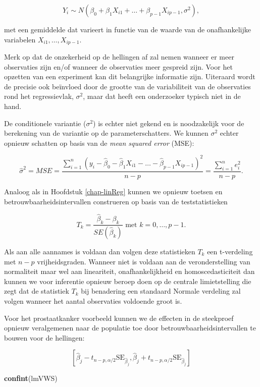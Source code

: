 \documentclass[
  12pt,dutch]{book}
\newenvironment{Shaded}{\begin{snugshade}}{\end{snugshade}}
\newcommand{\FunctionTok}[1]{\textcolor[rgb]{0.13,0.29,0.53}{\textbf{#1}}}
\newcommand{\NormalTok}[1]{#1}
\theoremstyle{definition}
\theoremstyle{definition}
\theoremstyle{definition}
\theoremstyle{definition}
\theoremstyle{remark}
\begin{document}
\[Y_i\sim N(\beta_0+\beta_1 X_{i1}+\ldots+\beta_{p-1} X_{ip-1},\sigma^2),\]

met een gemiddelde dat varieert in functie van de waarde van de onafhankelijke variabelen \(X_{i1},\ldots,X_{ip-1}\).

Merk op dat de onzekerheid op de hellingen af zal nemen wanneer er meer observaties zijn en/of wanneer de observaties meer gespreid zijn. Voor het opzetten van een experiment kan dit belangrijke informatie zijn. Uiteraard wordt de precisie ook beïnvloed door de grootte van de variabiliteit van de observaties rond het regressievlak, \(\sigma^2\), maar dat heeft een onderzoeker typisch niet in de hand.

De conditionele variantie (\(\sigma^2\)) is echter niet gekend en is noodzakelijk voor de berekening van de variantie op de parameterschatters. We kunnen \(\sigma^2\) echter opnieuw schatten op basis van de \emph{mean squared error} (MSE):

\[\hat\sigma^2=MSE=\frac{\sum\limits_{i=1}^n \left(y_i-\hat\beta_0-\hat\beta_1 X_{i1}-\ldots-\hat\beta_{p-1} X_{ip-1}\right)^2}{n-p}=\frac{\sum\limits_{i=1}^n e^2_i}{n-p}.\]

Analoog als in Hoofdstuk \ref{chap-linReg} kunnen we opnieuw toetsen en betrouwbaarheidsintervallen construeren op basis van de teststatistieken

\[T_k=\frac{\hat{\beta}_k-\beta_k}{SE(\hat{\beta}_k)} \text{ met } k=0, \ldots, p-1.\]

Als aan alle aannames is voldaan dan volgen deze statistieken \(T_k\) een t-verdeling met \(n-p\) vrijheidsgraden.
Wanneer niet is voldaan aan de veronderstelling van normaliteit maar wel aan lineariteit, onafhankelijkheid en homoscedasticiteit dan kunnen we voor inferentie opnieuw beroep doen op de centrale limietstelling die zegt dat de statistiek \(T_k\) bij benadering een standaard Normale verdeling zal volgen wanneer het aantal observaties voldoende groot is.

Voor het prostaatkanker voorbeeld kunnen we de effecten in de steekproef opnieuw veralgemenen naar de populatie toe door betrouwbaarheidsintervallen te bouwen voor de hellingen:

\[
[\hat\beta_j - t_{n-p,\alpha/2} \text{SE}_{\hat\beta_j},\hat\beta_j + t_{n-p,\alpha/2} \text{SE}_{\hat\beta_j}]
\]

\begin{Shaded}
\begin{Highlighting}[]
\FunctionTok{confint}\NormalTok{(lmVWS)}
\end{Highlighting}
\end{Shaded}
\end{document}
